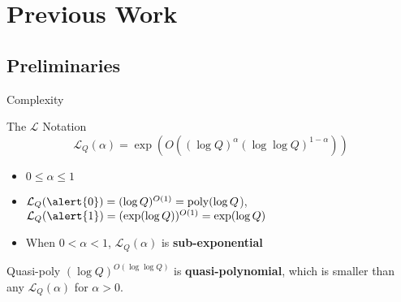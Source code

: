 \documentclass{beamer}
\begin{document}
\section{Previous Work}
	\subsection{Preliminaries}
		\begin{frame}{Complexity}
			\begin{block}{The $\mathcal{L}$ Notation}
				$$\mathcal{L}_Q(\alpha) = \exp(O((\log Q)^\alpha (\log\log Q)^{1-\alpha}))$$
				\begin{itemize}
					\item 
						$0 \le \alpha \le 1$
						\pause
					\item
						$\mathcal{L}_Q(\alert{0}) = (\log Q)^{O(1)} = \text{poly}(\log Q$),\\
						$\mathcal{L}_Q(\alert{1}) = (\exp(\log Q))^{O(1)} = \text{exp}(\log Q)$
						\pause
					\item
						When $0<\alpha<1$, $\mathcal{L}_Q(\alpha)$ is \textbf{sub-exponential}
				\end{itemize}
			\end{block}
			\pause
			\begin{block}{Quasi-poly}
				$(\log Q)^{O(\log\log Q)}$ is \textbf{quasi-polynomial}, 
				which is smaller than any $\mathcal{L}_Q(\alpha)$ for $\alpha >0$.
			\end{block}
		\end{frame}
\end{document}

